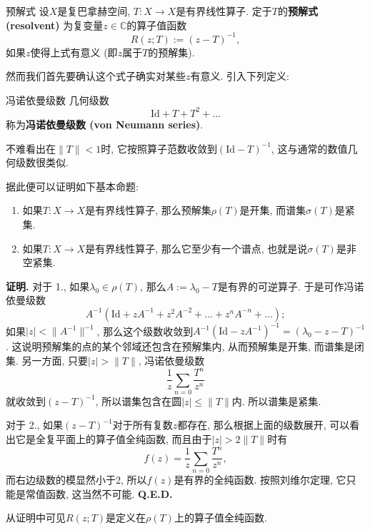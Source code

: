 

\begin{definition}{预解式}
设$X$是复巴拿赫空间, $T:X\to X$是有界线性算子. 定于$T$的\textbf{预解式 (resolvent)} 为复变量$z\in\mathbb{C}$的算子值函数
$$
R(z;T):=(z-T)^{-1},
$$
如果$z$使得上式有意义 (即$z$属于$T$的预解集).
\end{definition}

然而我们首先要确认这个式子确实对某些$z$有意义. 引入下列定义:

\begin{definition}{冯诺依曼级数}
几何级数
$$
\text{Id}+T+T^2+...
$$
称为\textbf{冯诺依曼级数 (von Neumann series)}.
\end{definition}
不难看出在$\|T\|<1$时, 它按照算子范数收敛到$(\text{Id}-T)^{-1}$, 这与通常的数值几何级数很类似.

据此便可以证明如下基本命题:

\begin{theorem}{}
\begin{enumerate}
\item 如果$T:X\to X$是有界线性算子, 那么预解集$\rho(T)$是开集, 而谱集$\sigma(T)$是紧集.
\item 如果$T:X\to X$是有界线性算子, 那么它至少有一个谱点, 也就是说$\sigma(T)$是非空紧集.
\end{enumerate}
\end{theorem}
\textbf{证明.} 
对于 1., 如果$\lambda_0\in\rho(T)$, 那么$A:=\lambda_0-T$是有界的可逆算子. 于是可作冯诺依曼级数
$$
A^{-1}(\text{Id}+zA^{-1}+z^2A^{-2}+...+z^nA^{-n}+...);
$$
如果$|z|<\|A^{-1}\|^{-1}$, 那么这个级数收敛到$A^{-1}(\text{Id}-zA^{-1})^{-1}=(\lambda_0-z-T)^{-1}$. 这说明预解集的点的某个邻域还包含在预解集内, 从而预解集是开集, 而谱集是闭集. 另一方面, 只要$|z|>\|T\|$, 冯诺依曼级数
$$
\frac{1}{z}\sum_{n=0}\frac{T^n}{z^n}
$$
就收敛到$(z-T)^{-1}$, 所以谱集包含在圆$|z|\leq\|T\|$内. 所以谱集是紧集.

对于 2., 如果$(z-T)^{-1}$对于所有复数$z$都存在, 那么根据上面的级数展开, 可以看出它是全复平面上的算子值全纯函数, 而且由于$|z|>2\|T\|$时有
$$
f(z)=\frac{1}{z}\sum_{n=0}\frac{T^n}{z^n},
$$
而右边级数的模显然小于2, 所以$f(z)$是有界的全纯函数. 按照刘维尔定理, 它只能是常值函数, 这当然不可能. \textbf{Q.E.D.}

从证明中可见$R(z;T)$是定义在$\rho(T)$上的算子值全纯函数.